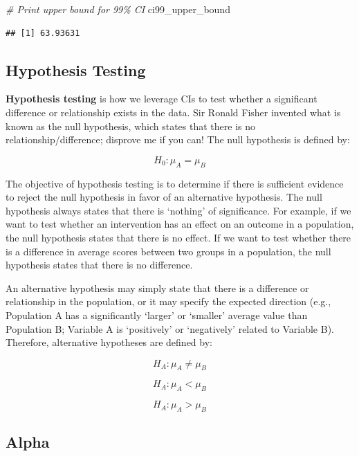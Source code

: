 \documentclass[
]{book}
\newenvironment{Shaded}{\begin{snugshade}}{\end{snugshade}}
\newcommand{\CommentTok}[1]{\textcolor[rgb]{0.56,0.35,0.01}{\textit{#1}}}
\newcommand{\NormalTok}[1]{#1}
\begin{document}
\begin{Shaded}
\begin{Highlighting}[]
\CommentTok{\# Print upper bound for 99\% CI}
\NormalTok{ci99\_upper\_bound}
\end{Highlighting}
\end{Shaded}

\begin{verbatim}
## [1] 63.93631
\end{verbatim}

\hypertarget{hypothesis-testing}{%
\subsection{Hypothesis Testing}\label{hypothesis-testing}}

\textbf{Hypothesis testing} is how we leverage CIs to test whether a significant difference or relationship exists in the data. Sir Ronald Fisher invented what is known as the null hypothesis, which states that there is no relationship/difference; disprove me if you can! The null hypothesis is defined by:

\[ H_0: \mu_A = \mu_B \]

The objective of hypothesis testing is to determine if there is sufficient evidence to reject the null hypothesis in favor of an alternative hypothesis. The null hypothesis always states that there is `nothing' of significance. For example, if we want to test whether an intervention has an effect on an outcome in a population, the null hypothesis states that there is no effect. If we want to test whether there is a difference in average scores between two groups in a population, the null hypothesis states that there is no difference.

An alternative hypothesis may simply state that there is a difference or relationship in the population, or it may specify the expected direction (e.g., Population A has a significantly `larger' or `smaller' average value than Population B; Variable A is `positively' or `negatively' related to Variable B). Therefore, alternative hypotheses are defined by:

\[ H_A: \mu_A \neq \mu_B \]

\[ H_A: \mu_A < \mu_B \]

\[ H_A: \mu_A > \mu_B \]

\hypertarget{alpha}{%
\subsection{Alpha}\label{alpha}}
\end{document}

